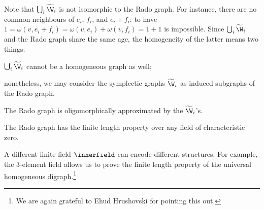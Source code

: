 Note that $\bigcup_{i} \widetilde \W_i$ is not isomorphic to the Rado graph.
For instance, there are no common neighbours of $e_i$, $f_i$, and $e_i + f_i$:
to have $1 = \omega(v, e_i + f_i) = \omega(v, e_i) + \omega(v, f_i) = 1 + 1$ is impossible.
Since $\bigcup_{i} \widetilde \W_i$ and the Rado graph share the same age, the homogeneity of the latter means two things:
\begin{bracketenumerate}
    \item $\bigcup_{i} \widetilde \W_i$ cannot be a homogeneous graph as well;
    \item nonetheless, we may consider the symplectic graphs $\widetilde \W_i$ as induced subgraphs of the Rado graph.
\end{bracketenumerate}

\begin{theorem} \label{thm:appendix-rado-oligo-approx}
    The Rado graph is oligomorphically approximated by the $\widetilde \W_i$'s.
\end{theorem}

\begin{corollary}
    The Rado graph has the finite length property over any field of characteristic zero.
\end{corollary}

A different finite field $\innerfield$ can encode different structures.
For example, the 3-element field allows us to prove the finite length property of the universal homogeneous digraph.\footnote{We are again grateful to Ehud Hrushovski for pointing this out.}